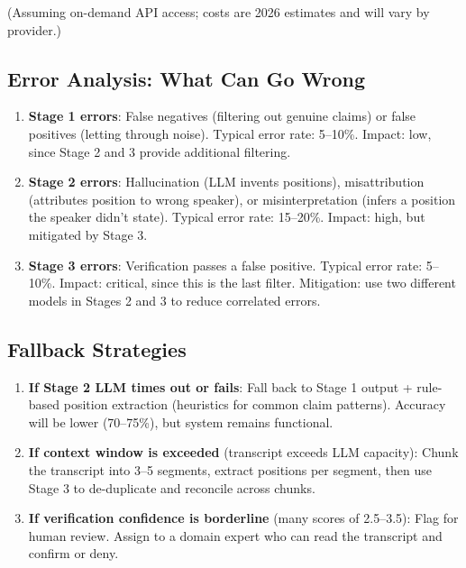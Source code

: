 \documentclass[11pt,letterpaper]{article}
\begin{document}
(Assuming on-demand API access; costs are 2026 estimates and will vary by provider.)

\subsection{Error Analysis: What Can Go Wrong}

\begin{enumerate}
  \item \textbf{Stage 1 errors}: False negatives (filtering out genuine claims) or false positives (letting through noise). Typical error rate: 5–10\%. Impact: low, since Stage 2 and 3 provide additional filtering.

  \item \textbf{Stage 2 errors}: Hallucination (LLM invents positions), misattribution (attributes position to wrong speaker), or misinterpretation (infers a position the speaker didn't state). Typical error rate: 15–20\%. Impact: high, but mitigated by Stage 3.

  \item \textbf{Stage 3 errors}: Verification passes a false positive. Typical error rate: 5–10\%. Impact: critical, since this is the last filter. Mitigation: use two different models in Stages 2 and 3 to reduce correlated errors.
\end{enumerate}

\subsection{Fallback Strategies}

\begin{enumerate}
  \item \textbf{If Stage 2 LLM times out or fails}: Fall back to Stage 1 output + rule-based position extraction (heuristics for common claim patterns). Accuracy will be lower (70–75\%), but system remains functional.

  \item \textbf{If context window is exceeded} (transcript exceeds LLM capacity): Chunk the transcript into 3–5 segments, extract positions per segment, then use Stage 3 to de-duplicate and reconcile across chunks.

  \item \textbf{If verification confidence is borderline} (many scores of 2.5–3.5): Flag for human review. Assign to a domain expert who can read the transcript and confirm or deny.
\end{enumerate}
\end{document}
